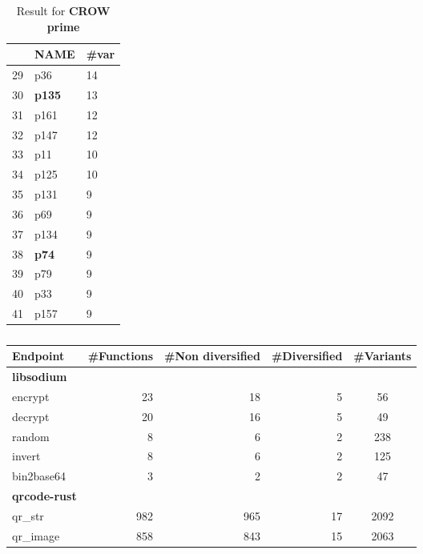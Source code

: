 \begin{table*}
\begin{tabular}[t]{l | l l}
    \midrule
    & NAME & \#var  \\
    \hline
    29 & p36 & 14 \\
    \hline
    30 & \textbf{p135} & 13  \\
    \hline
    31 & p161 & 12 \\
    \hline
    32 & p147 & 12 \\
    \hline
    33 & p11 & 10  \\
    \hline
    34 & p125 & 10  \\
    \hline
    35 & p131 & 9 \\
    \hline
    36 & p69 & 9 \\
    \hline
    37 & p134 & 9 \\
    \hline
    38 & \textbf{p74} & 9  \\
    \hline
    39 & p79 & 9 \\
    \hline
    40 & p33 & 9  \\
    \hline
    41 & p157 & 9 \\
    \hline
    \end{tabular}
    \caption{Result for \textbf{CROW prime}}
    \label{tables:rq2:dynamic}
    \end{table*}
    

    {
\begin{table*}
\centering
\begin{tabular}{  p{2.6cm} | r r r c  }
    \hline
    Endpoint & \#Functions & \#Non diversified & \#Diversified & \#Variants \\
    \midrule

    
    \textbf{libsodium} & & & & \\
    \hline
        
    encrypt & 23  & 18 & 5 & 56 \\

    decrypt & 20  & 16 & 5 & 49   \\

    random & 8  & 6 & 2  & 238  \\

    invert & 8  & 6 & 2 & 125  \\

    bin2base64 & 3 & 2 & 2 & 47   \\

    \hline
    \textbf{qrcode-rust}  & & & & \\
    \hline
    qr\_str &  982  & 965 & 17 & 2092   \\
    qr\_image & 858  & 843  & 15 & 2063    \\
    \hline


\end{tabular}

\caption{}\label{table:CFG1}
\end{table*}
}